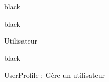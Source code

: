 \begin{items}{black}{\Bullet}
\begin{items}{black}{\Triangle}
\item Utilisateur

\begin{items}{black}{\Bullet}
\item UserProfile : Gère un utilisateur
\end{items}

\end{items}

\end {items}





